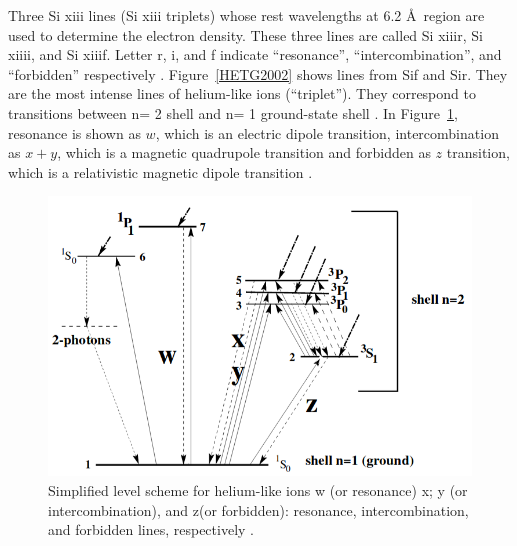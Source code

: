Three Si {\sc xiii} lines (Si {\sc xiii} triplets) whose rest wavelengths at 6.2 \AA\ region are used to determine the electron density. These three lines are called  Si {\sc xiii}r,  Si {\sc xiii}i, and  Si {\sc xiii}f. Letter r, i, and f indicate ``resonance'', ``intercombination'', and ``forbidden'' respectively \citep{porquet2010}. Figure~\ref{HETG2002} shows lines from Sif and Sir. They are the most intense lines of helium-like ions (``triplet''). They correspond to transitions between n= 2 shell and n= 1 ground-state shell \citep{porquet2010}. In Figure~\ref{rif}, resonance is shown as $w$, which is an electric dipole transition, intercombination as $x + y$, which is a magnetic quadrupole transition and forbidden as $z$ transition, which is a relativistic magnetic dipole transition \citep{porquet2010}.



\begin{figure}[h!]
    \centering
    \includegraphics[width = 0.7\linewidth]{Chapters/Figures/rifgraph.png}
    \caption{Simplified level scheme for helium-like ions w (or resonance) x; y (or intercombination), and z(or forbidden): resonance, intercombination, and forbidden lines, respectively \citep{porquet2010}.}
    \label{rif}
\end{figure}







